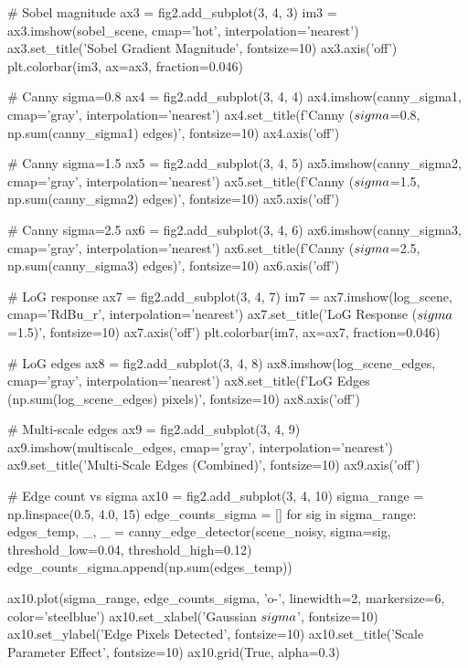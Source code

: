 \documentclass[a4paper, 11pt]{article}
\begin{document}
\begin{pycode}
# Sobel magnitude
ax3 = fig2.add_subplot(3, 4, 3)
im3 = ax3.imshow(sobel_scene, cmap='hot', interpolation='nearest')
ax3.set_title('Sobel Gradient Magnitude', fontsize=10)
ax3.axis('off')
plt.colorbar(im3, ax=ax3, fraction=0.046)

# Canny sigma=0.8
ax4 = fig2.add_subplot(3, 4, 4)
ax4.imshow(canny_sigma1, cmap='gray', interpolation='nearest')
ax4.set_title(f'Canny ($\\sigma$=0.8, {np.sum(canny_sigma1)} edges)', fontsize=10)
ax4.axis('off')

# Canny sigma=1.5
ax5 = fig2.add_subplot(3, 4, 5)
ax5.imshow(canny_sigma2, cmap='gray', interpolation='nearest')
ax5.set_title(f'Canny ($\\sigma$=1.5, {np.sum(canny_sigma2)} edges)', fontsize=10)
ax5.axis('off')

# Canny sigma=2.5
ax6 = fig2.add_subplot(3, 4, 6)
ax6.imshow(canny_sigma3, cmap='gray', interpolation='nearest')
ax6.set_title(f'Canny ($\\sigma$=2.5, {np.sum(canny_sigma3)} edges)', fontsize=10)
ax6.axis('off')

# LoG response
ax7 = fig2.add_subplot(3, 4, 7)
im7 = ax7.imshow(log_scene, cmap='RdBu_r', interpolation='nearest')
ax7.set_title('LoG Response ($\\sigma$=1.5)', fontsize=10)
ax7.axis('off')
plt.colorbar(im7, ax=ax7, fraction=0.046)

# LoG edges
ax8 = fig2.add_subplot(3, 4, 8)
ax8.imshow(log_scene_edges, cmap='gray', interpolation='nearest')
ax8.set_title(f'LoG Edges ({np.sum(log_scene_edges)} pixels)', fontsize=10)
ax8.axis('off')

# Multi-scale edges
ax9 = fig2.add_subplot(3, 4, 9)
ax9.imshow(multiscale_edges, cmap='gray', interpolation='nearest')
ax9.set_title('Multi-Scale Edges (Combined)', fontsize=10)
ax9.axis('off')

# Edge count vs sigma
ax10 = fig2.add_subplot(3, 4, 10)
sigma_range = np.linspace(0.5, 4.0, 15)
edge_counts_sigma = []
for sig in sigma_range:
    edges_temp, _, _ = canny_edge_detector(scene_noisy, sigma=sig, threshold_low=0.04, threshold_high=0.12)
    edge_counts_sigma.append(np.sum(edges_temp))

ax10.plot(sigma_range, edge_counts_sigma, 'o-', linewidth=2, markersize=6, color='steelblue')
ax10.set_xlabel('Gaussian $\\sigma$', fontsize=10)
ax10.set_ylabel('Edge Pixels Detected', fontsize=10)
ax10.set_title('Scale Parameter Effect', fontsize=10)
ax10.grid(True, alpha=0.3)


\end{pycode}
\end{document}
